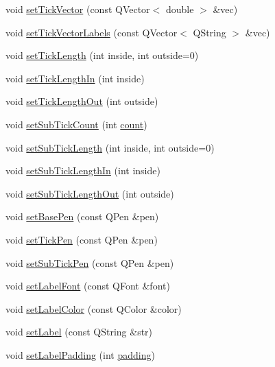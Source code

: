 \begin{DoxyCompactItemize}
\item 
void \hyperlink{class_q_c_p_axis_a871db94c5d796c80fcbe1a9d4506e27e}{set\+Tick\+Vector} (const Q\+Vector$<$ double $>$ \&vec)
\item 
void \hyperlink{class_q_c_p_axis_a921d3ba3853ca3bd2cce3459f7a243ed}{set\+Tick\+Vector\+Labels} (const Q\+Vector$<$ Q\+String $>$ \&vec)
\item 
void \hyperlink{class_q_c_p_axis_a62ec40bebe3540e9c1479a8fd2be3b0d}{set\+Tick\+Length} (int inside, int outside=0)
\item 
void \hyperlink{class_q_c_p_axis_afae1a37a99611366275a51204d991739}{set\+Tick\+Length\+In} (int inside)
\item 
void \hyperlink{class_q_c_p_axis_a3b8a0debd1ffedd2c22d0592dfbb4e62}{set\+Tick\+Length\+Out} (int outside)
\item 
void \hyperlink{class_q_c_p_axis_a4b1554ead9d7f9799650d51383e326dd}{set\+Sub\+Tick\+Count} (int \hyperlink{_v_s_a___u_t_2_comparision_pictures_2_createtest_image_8m_ae11b3deb3de3df7dc48e439074023e35}{count})
\item 
void \hyperlink{class_q_c_p_axis_ab702d6fd42fc620607435339a1c2a2e1}{set\+Sub\+Tick\+Length} (int inside, int outside=0)
\item 
void \hyperlink{class_q_c_p_axis_ac46fa2a993a9f5789540977610acf1de}{set\+Sub\+Tick\+Length\+In} (int inside)
\item 
void \hyperlink{class_q_c_p_axis_a4c6dfc3963492ed72a77724012df5f23}{set\+Sub\+Tick\+Length\+Out} (int outside)
\item 
void \hyperlink{class_q_c_p_axis_a778d45fb71b3c7ab3bb7079e18b058e4}{set\+Base\+Pen} (const Q\+Pen \&pen)
\item 
void \hyperlink{class_q_c_p_axis_ad80923bcc1c5da4c4db602c5325e797e}{set\+Tick\+Pen} (const Q\+Pen \&pen)
\item 
void \hyperlink{class_q_c_p_axis_aede4028ae7516bd51a60618a8233f9cf}{set\+Sub\+Tick\+Pen} (const Q\+Pen \&pen)
\item 
void \hyperlink{class_q_c_p_axis_a71ac1a47f7547e490a8c4311d1433cf3}{set\+Label\+Font} (const Q\+Font \&font)
\item 
void \hyperlink{class_q_c_p_axis_a6c906fe56d75f0122335b9f79b999608}{set\+Label\+Color} (const Q\+Color \&color)
\item 
void \hyperlink{class_q_c_p_axis_a33bcc382c111c9f31bb0687352a2dea4}{set\+Label} (const Q\+String \&str)
\item 
void \hyperlink{class_q_c_p_axis_a4391192a766e5d20cfe5cbc17607a7a2}{set\+Label\+Padding} (int \hyperlink{class_q_c_p_axis_abb85015a9467ec176e70698307ec833a}{padding})

\end{DoxyCompactItemize}
